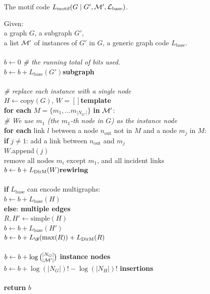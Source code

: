 \begin{pseudo}[th]
\caption{The motif code $L_\text{motif}(G \mid G', {\cal M', L_\text{base}})$.}
\label{algorithm:motif-code}
{
Given:\\ 
\tab a graph $G$, a subgraph $G'$,\\ 
\tab a list $\cal M'$ of instances of $G'$ in $G$, a generic graph code $L_\text{base}$.\\
\\
$b \leftarrow 0$ \emph{\# the running total of bits used.} \\
$b \leftarrow b + L_\text{base}(G')$\hfill \textbf{subgraph} \\
\\
\emph{\# replace each instance with a single node} \\
$H \leftarrow \text{copy}(G)$, $W = [] $\hfill \textbf{template} \\
\textbf{for each } $M = \{ m_1, \ldots m_{|N_{G'}|}\}$ \textbf{in} $\cal M'$:\\
\tab \emph{\# We use $m_1$ (the $m_1$-th node in $G$) as the instance node}\\
\tab \textbf{for each} link $l$ between a node $n_\text{out}$ not in $M$ and a node $m_j$ in $M$:\\
\tab \tab \textbf{if} $j \neq 1$: add a link between $n_\text{out}$ and $m_j$\\
\tab \tab $W$.append$(j)$\\
\tab remove all nodes $m_i$ except $m_1$, and all incident links\\
$b \leftarrow b + L_\text{DirM}(W)\hfill\textbf{rewiring}$\\
\\
\textbf{if} $L_\text{base}$ can encode multigraphs:\\
\tab $b \leftarrow b + L_\text{base}(H)$\\ 
\textbf{else}: \hfill \textbf{multiple edges}\\
\tab $R, H' \leftarrow \text{simple}(H)$ \\
\tab $b \leftarrow b + L_\text{base}(H')$\\ 
\tab $b \leftarrow b + L_\N(\max(R)) + L_\text{DirM}(R)$\\
\\
$b \leftarrow b + \log {|N_G| \choose |{\cal M'}|}$ \hfill \textbf{instance nodes}\\
$b \leftarrow b + \log (|N_G|)! - \log (|N_H|)!$ \hfill \textbf{insertions}\\    
\\
\textbf{return} $b$\\
}
\end{pseudo}

